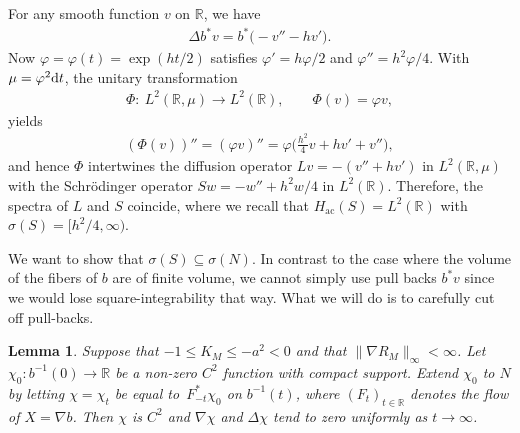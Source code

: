 \documentclass[10pt,a4paper]{amsart}
\numberwithin{equation}{section}
\newtheorem{Lemma}[Theorem]{Lemma}
\def\ac{\mathrm{ac}}
\def\R{\mathbb R}
\def\vf{\varphi}
\begin{document}
For any smooth function $v$ on $\R$, we have
\begin{align*}
	\Delta b^*v = b^*\bigl(-v'' - hv'\bigr).
\end{align*}
Now $\vf=\vf(t)=\exp(ht/2)$ satisfies $\vf'=h\vf/2$ and $\vf''=h^2\vf/4$.
With $\mu=\vf^2{\rm d}t$, the unitary transformation
\begin{align*}
	\Phi \colon \ L^2(\R,\mu) \to L^2(\R), \qquad \Phi(v) = \vf v,
\end{align*}
yields
\begin{align*}
	(\Phi(v))'' = (\vf v)'' = \vf\biggl(\frac{h^2}4v + hv' + v''\biggr),
\end{align*}
and hence $\Phi$ intertwines the diffusion operator $Lv=-(v''+hv')$ in $L^2(\R,\mu)$
with the Schr\"odinger operator $Sw=-w''+h^2w/4$ in $L^2(\R)$.
Therefore, the spectra of $L$ and $S$ coincide,
where we recall that $H_{\ac}(S)=L^2(\R)$ with $\sigma(S)=\bigl[h^2/4,\infty\bigr)$.

We want to show that $\sigma(S)\subseteq\sigma(N)$.
In contrast to the case where the volume of the fibers of $b$ are of finite volume,
we cannot simply use pull backs $b^*v$ since we would lose square-integrability that way.
What we will do is to carefully cut off pull-backs.

\begin{Lemma}
Suppose that $-1\le K_M\le-a^2<0$ and that $\|\nabla R_M\|_\infty<\infty$.
Let $\chi_0\colon b^{-1}(0)\to\R$ be a non-zero $C^2$ function with compact support.
Extend $\chi_0$ to $N$ by letting $\chi=\chi_t$ be equal to~$F_{-t}^*\chi_0$ on $b^{-1}(t)$,
where $(F_t)_{t\in\R}$ denotes the flow of $X=\nabla b$.
Then $\chi$ is $C^2$ and $\nabla\chi$ and $\Delta\chi$ tend to zero uniformly as $t\to\infty$.
\end{Lemma}
\end{document}
